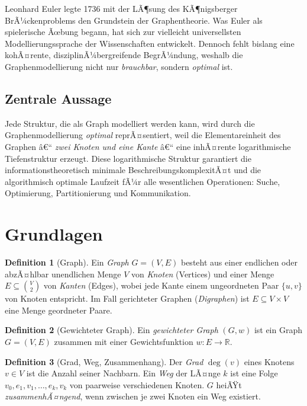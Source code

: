 ﻿\documentclass[12pt,a4paper,twoside]{article}
\theoremstyle{definition}
\newtheorem{definition}{Definition}[section]
\theoremstyle{plain}
\theoremstyle{remark}
\begin{document}
Leonhard Euler legte 1736 mit der LÃ¶sung des KÃ¶nigsberger
BrÃ¼ckenproblems den Grundstein der Graphentheorie.  Was Euler
als spielerische Ãœbung begann, hat sich zur vielleicht
universellsten Modellierungssprache der Wissenschaften entwickelt.
Dennoch fehlt bislang eine kohÃ¤rente, disziplinÃ¼bergreifende
BegrÃ¼ndung, weshalb die Graphenmodellierung nicht nur
\emph{brauchbar}, sondern \emph{optimal} ist.

\subsection{Zentrale Aussage}

Jede Struktur, die als Graph modelliert werden
kann, wird durch die Graphenmodellierung \emph{optimal} reprÃ¤sentiert,
weil die Elementareinheit des Graphen â€“ \emph{zwei Knoten und eine
Kante} â€“ eine inhÃ¤rente logarithmische Tiefenstruktur erzeugt.
Diese logarithmische Struktur garantiert die informationstheoretisch
minimale BeschreibungskomplexitÃ¤t und die algorithmisch optimale
Laufzeit fÃ¼r alle wesentlichen Operationen: Suche, Optimierung,
Partitionierung und Kommunikation.

\section{Grundlagen}
\label{sec:grundlagen}

\begin{definition}[Graph]
Ein \emph{Graph} $G = (V, E)$ besteht aus einer endlichen oder
abzÃ¤hlbar unendlichen Menge $V$ von \emph{Knoten} (Vertices) und
einer Menge $E \subseteq \binom{V}{2}$ von \emph{Kanten} (Edges),
wobei jede Kante einem ungeordneten Paar $\{u,v\}$ von Knoten
entspricht.  Im Fall gerichteter Graphen (\emph{Digraphen}) ist
$E \subseteq V \times V$ eine Menge geordneter Paare.
\end{definition}

\begin{definition}[Gewichteter Graph]
Ein \emph{gewichteter Graph} $(G, w)$ ist ein Graph $G=(V,E)$
zusammen mit einer Gewichtsfunktion $w: E \to \mathbb{R}$.
\end{definition}

\begin{definition}[Grad, Weg, Zusammenhang]
Der \emph{Grad} $\deg(v)$ eines Knotens $v \in V$ ist die Anzahl
seiner Nachbarn.  Ein \emph{Weg} der LÃ¤nge $k$ ist eine Folge
$v_0, e_1, v_1, \ldots, e_k, v_k$ von paarweise verschiedenen
Knoten.  $G$ heiÃŸt \emph{zusammenhÃ¤ngend}, wenn zwischen je zwei
Knoten ein Weg existiert.
\end{definition}
\end{document}
